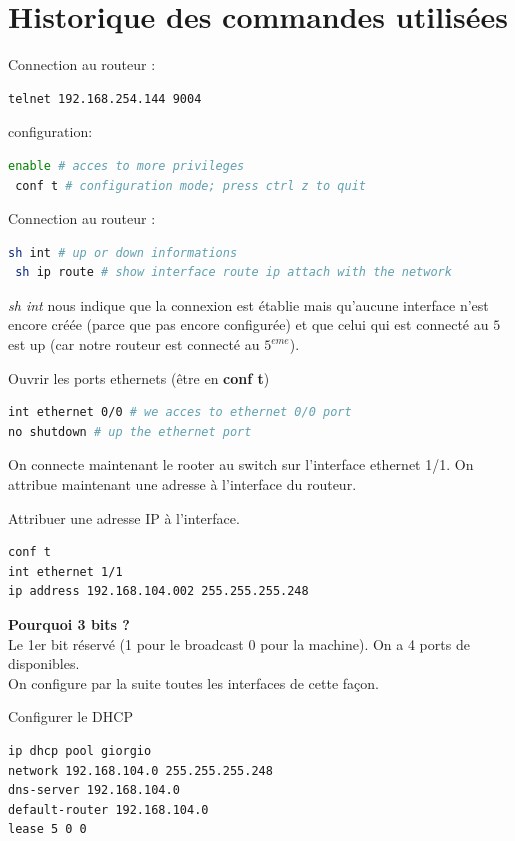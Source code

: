 \documentclass[10pt,a4paper]{article}
\begin{document}
\section{Historique des commandes utilisées}

\noindent Connection au routeur :
\begin{lstlisting}[language=bash]
 telnet 192.168.254.144 9004
\end{lstlisting}

\noindent configuration:
\begin{lstlisting}[language=bash]
 enable # acces to more privileges
 conf t # configuration mode; press ctrl z to quit 
\end{lstlisting}

\noindent Connection au routeur :
\begin{lstlisting}[language=bash]
 sh int # up or down informations
 sh ip route # show interface route ip attach with the network
\end{lstlisting}

\textit{sh int} nous indique que la connexion est établie mais qu'aucune interface n'est encore créée (parce que pas encore configurée) et que celui qui est connecté au $5$ est up (car notre routeur est connecté au $5^{eme}$).

\noindent Ouvrir les ports ethernets (être en \textbf{conf t})
\begin{lstlisting}[language=bash]
int ethernet 0/0 # we acces to ethernet 0/0 port
no shutdown # up the ethernet port
\end{lstlisting}

On connecte maintenant le rooter au switch sur l'interface ethernet 1/1. On attribue maintenant une adresse à l'interface du routeur.

\noindent Attribuer une adresse IP à l'interface.
\begin{lstlisting}[language=bash]
conf t
int ethernet 1/1
ip address 192.168.104.002 255.255.255.248
\end{lstlisting}
\textbf{Pourquoi 3 bits ?}\\
Le 1er bit réservé (1 pour le broadcast 0 pour la machine). On a 4 ports de disponibles.\\
On configure par la suite toutes les interfaces de cette façon.

\noindent Configurer le DHCP
\begin{lstlisting}[language=bash]
ip dhcp pool giorgio
network 192.168.104.0 255.255.255.248
dns-server 192.168.104.0
default-router 192.168.104.0
lease 5 0 0
\end{lstlisting}
\end{document}
